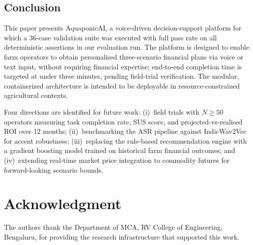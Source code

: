 \documentclass[conference]{IEEEtran}
\begin{document}
\subsection{Conclusion}

This paper presents AquaponicAI, a voice-driven decision-support
platform for which a 36-case validation suite was executed with
full pass rate on all deterministic assertions in our evaluation run.
The platform is designed to enable farm operators to obtain
personalised three-scenario financial plans via voice or text input,
without requiring financial expertise; end-to-end completion time
is targeted at under three minutes, pending field-trial verification.
The modular, containerized architecture is intended to be
deployable in resource-constrained agricultural contexts.

Four directions are identified for future work:
(i)~field trials with $N{\geq}50$ operators measuring task completion
rate, SUS score, and projected-vs-realised ROI over 12 months;
(ii)~benchmarking the ASR pipeline against IndicWav2Vec for accent
robustness;
(iii)~replacing the rule-based recommendation engine with a gradient
boosting model trained on historical farm financial outcomes; and
(iv)~extending real-time market price integration to commodity futures
for forward-looking scenario bounds.


\section*{Acknowledgment}

The authors thank the Department of MCA, RV College of Engineering,
Bengaluru, for providing the research infrastructure that supported
this work.
\end{document}

